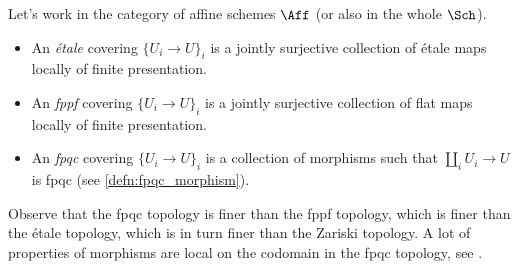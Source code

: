         \begin{defn}
            \label{defn:grothendieck_topologies}
            Let's work in the category of affine schemes $\Aff$ (or also in the whole $\Sch$). 
            \begin{itemize}
                \item An \emph{étale} covering $\{U_i \to U\}_i$ is a jointly surjective collection of étale maps locally of finite presentation.
                \item An \emph{fppf} covering $\{U_i \to U\}_i$ is a jointly surjective collection of flat maps locally of finite presentation.
                \item An \emph{fpqc} covering $\{U_i \to U\}_i$ is a collection of morphisms such that $\coprod_i U_i \to U$ is fpqc (see \cref{defn:fpqc_morphism}).
            \end{itemize}
        \end{defn}

        Observe that the fpqc topology is finer than the fppf topology, which is finer than the étale topology, which is in turn finer than the Zariski topology.
        A lot of properties of morphisms are local on the codomain in the fpqc topology, see \cite[Proposition~2.36]{Vist:desc}.


